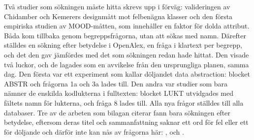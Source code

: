 Två studier som sökningen måste hitta skrevs upp i förväg: valideringen
av Chidamber och Kemerers designmått mot felbenägna
klasser\autocite{Basili1996Validation} och den första empiriska studien
av MOOD-måtten, som innehåller en faktor för dolda
attribut\autocite{BritoeAbreu1996Impact}.  Båda kom tillbaka genom
begreppsfrågorna, utan att sökas med namn.  Därefter ställdes en sökning
efter betydelse i OpenAlex, en fråga i klartext per begrepp, och det den
gav jämfördes med det som sökningen redan hade hittat.  Den visade två
luckor, och de lagades som en avvikelse från den ursprungliga planen,
samma dag.  Den första var ett experiment som kallar döljandet
\foreignlanguage{english}{data
abstraction}\autocite{Meeson1979DataAbstraction}: blocket ABSTR och
frågorna 1a och 3a lades till.  Den andra var studier
som bara nämner de enskilda kodlukterna i fulltexten: blocket LUKT
utvidgades med fältets namn för lukterna, och fråga 8 lades till.  Alla
nya frågor ställdes till alla databaser.  Tre av de arbeten som
bilagan citerar fann bara sökningen efter betydelse, eftersom deras
titel och sammanfattning saknar ett ord för fel eller ett för döljande
och därför inte kan nås av frågorna här: \textcite{Snyder1986},
\textcite{Lumpe2010Properties} och \textcite{Thomasson2006Novice}.

